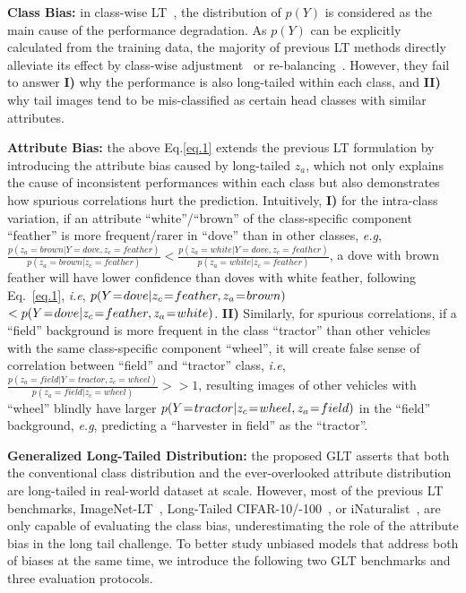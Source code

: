 \documentclass{article}
\def\eg{\emph{e.g}} \def\Eg{\emph{E.g}}
\def\ie{\emph{i.e}} \def\Ie{\emph{I.e}}
\newcommand\myeq{\mkern1.5mu{=}\mkern1.5mu}
\begin{document}
\noindent\textbf{Class Bias:} in class-wise LT~\cite{zhang2021deep},  the distribution of $p(Y)$ is considered as the main cause of the performance degradation. As $p(Y)$ can be explicitly calculated from the training data, the majority of previous LT methods directly alleviate its effect by class-wise adjustment~\cite{ren2020balanced,menon2020long} or re-balancing~\cite{kang2019decoupling,zhou2019bbn}. However, they fail to answer 
\textbf{I)} why the performance is also long-tailed within each class, and 
\textbf{II)} why tail images tend to be mis-classified as certain head classes with similar attributes. 


\noindent\textbf{Attribute Bias:} the above Eq.\eqref{eq.1} extends the previous LT formulation by introducing the attribute bias caused by long-tailed $z_a$, which not only explains the cause of inconsistent performances within each class but also demonstrates how spurious correlations hurt the prediction. Intuitively, 
\textbf{I)} for the intra-class variation, if an attribute ``white''/``brown'' of the class-specific component ``feather'' is more frequent/rarer in ``dove'' than in other classes, \eg, $\frac{p(z_a=brown|Y=dove, z_c=feather)}{p(z_a=brown|z_c=feather)} < \frac{p(z_a=white|Y=dove, z_c=feather)}{p(z_a=white|z_c=feather)}$, a dove with brown feather will have lower confidence than doves with white feather, following Eq.~\eqref{eq.1}, \ie, $p(Y \myeq dove|z_c \myeq feather,z_a \myeq brown)$ $< p(Y \myeq dove|z_c \myeq feather,z_a \myeq white)$. 
\textbf{II)} Similarly, for spurious correlations, if a ``field'' background is more frequent in the class ``tractor'' than other vehicles with the same class-specific component ``wheel'', it will create false sense of correlation between ``field'' and ``tractor'' class, \ie, $\frac{p(z_a = field|Y = tractor, z_c=wheel)}{p(z_a = field|z_c=wheel)} >> 1$, resulting images of other vehicles with ``wheel'' blindly have larger $p(Y \myeq tractor|z_c \myeq wheel,z_a \myeq field)$ in the ``field'' background, \eg, predicting a ``harvester in field'' as the ``tractor''. 


\noindent\textbf{Generalized Long-Tailed Distribution: } the proposed GLT asserts that both the conventional class distribution and the ever-overlooked attribute distribution are long-tailed in real-world dataset at scale. However, most of the previous LT benchmarks, ImageNet-LT~\cite{liu2019large}, Long-Tailed CIFAR-10/-100~\cite{zhou2019bbn}, or iNaturalist~\cite{van2018inaturalist}, are only capable of evaluating the class bias, underestimating the role of the attribute bias in the long tail challenge. To better study unbiased models that address both of biases at the same time, we introduce the following two GLT benchmarks and three evaluation protocols.
\end{document}
